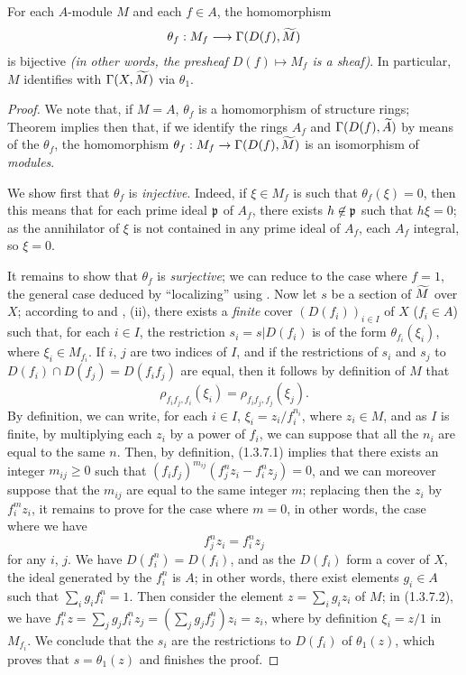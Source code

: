 \begin{thm}[1.3.7]
\label{1.1.3.7}
For each $A$-module $M$ and each $f\in A$, the homomorphism
\[
  \theta_f:M_f\longrightarrow\Gamma(D(f),\widetilde{M})
\]
is bijective \emph{(in other words, the presheaf $D(f)\mapsto M_f$ is a \emph{sheaf})}. In
particular, $M$ identifies with $\Gamma(X,\widetilde{M})$ via $\theta_1$.
\end{thm}

\begin{proof}
\label{proof-1.1.3.7}
We note that, if $M=A$, $\theta_f$ is a homomorphism of structure rings; Theorem
 implies then that, if we identify the rings $A_f$ and
$\Gamma(D(f),\widetilde{A})$ by means of the $\theta_f$, the homomorphism
$\theta_f:M_f\to\Gamma(D(f),\widetilde{M})$ is an isomorphism of \emph{modules}.

We show first that $\theta_f$ is \emph{injective}. Indeed, if $\xi\in M_f$ is such that
$\theta_f(\xi)=0$, then this means that for each prime ideal $\mathfrak{p}$ of $A_f$, there
exists $h\not\in\mathfrak{p}$ such that $h\xi=0$; as the annihilator of $\xi$ is not
contained in any prime ideal of $A_f$, each $A_f$ integral, so $\xi=0$.

It remains to show that $\theta_f$ is \emph{surjective}; we can reduce to the case where
$f=1$, the general case deduced by ``localizing'' using . Now let $s$ be a
section of $\widetilde{M}$ over $X$; according to  and
, (ii), there exists a \emph{finite} cover $(D(f_i))_{i\in I}$ of $X$
($f_i\in A$) such that, for each $i\in I$, the restriction $s_i=s|D(f_i)$ is of the form
$\theta_{f_i}(\xi_i)$, where $\xi_i\in M_{f_i}$. If $i$, $j$ are two indices of $I$, and if
the restrictions of $s_i$ and $s_j$ to $D(f_i)\cap D(f_j)=D(f_i f_j)$ are equal, then
it follows by definition of $M$ that
\[
  \rho_{f_i f_j,f_i}(\xi_i)=\rho_{f_i f_j,f_j}(\xi_j).
  \tag{1.3.7.1}
\]
By definition, we can write, for each $i\in I$, $\xi_i=z_i/f_i^{n_i}$, where $z_i\in M$, and
as $I$ is finite, by multiplying each $z_i$ by a power of $f_i$, we can suppose that all the
$n_i$ are equal to the same $n$. Then, by definition, (1.3.7.1) implies that there exists an
integer $m_{ij}\geqslant 0$ such that $(f_i f_j)^{m_{ij}}(f_j^n z_i-f_i^n z_j)=0$, and we can
moreover suppose that the $m_{ij}$ are equal to the same integer $m$; replacing then the
$z_i$ by $f_i^m z_i$, it remains to prove for the case where $m=0$, in other words, the case
where we have
\[
  f_j^n z_i=f_i^n z_j
  \tag{1.3.7.2}
\]
for any $i$, $j$. We have $D(f_i^n)=D(f_i)$, and as the $D(f_i)$ form a cover of $X$,
the ideal generated by the $f_i^n$ is $A$; in other words, there exist elements $g_i\in A$
such that $\sum_i g_i f_i^n=1$. Then consider the element $z=\sum_i g_i z_i$ of $M$; in
(1.3.7.2), we have $f_i^n z=\sum_j g_j f_i^n z_j=(\sum_j g_j f_j^n)z_i=z_i$, where by
definition $\xi_i=z/1$ in $M_{f_i}$. We conclude
that the $s_i$ are the restrictions to $D(f_i)$ of $\theta_1(z)$, which proves that
$s=\theta_1(z)$ and finishes the proof.
\end{proof}

